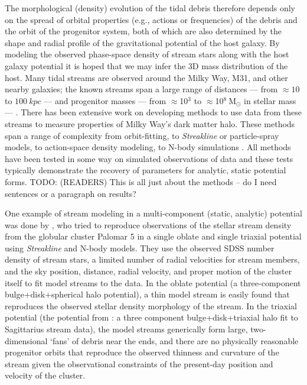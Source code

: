\documentclass[letterpaper,12pt,preprint]{aastex}
\newcommand{\msun}{\ensuremath{\mathrm{M}_\odot}}
\newcommand{\todo}[2]{{\color{red} TODO: (\MakeUppercase{#1}) #2}}
\begin{document}
The morphological (density) evolution of the tidal debris therefore depends only on the spread of orbital properties (e.g., actions or frequencies) of the debris and the orbit of the progenitor system, both of which are also determined by the shape and radial profile of the gravitational potential of the host galaxy. By modeling the observed phase-space density of stream stars along with the host galaxy potential it is hoped that we may infer the 3D mass distribution of the host. Many tidal streams are observed around the Milky Way, M31, and other nearby galaxies; the known streams span a large range of distances --- from $\approx10$ to $100~kpc$ --- and progenitor masses --- from $\approx$10$^3$ to $\approx$10$^8~\msun$ in stellar mass --- \citep[][]{cite many}. There has been extensive work on developing methods to use data from these streams to measure properties of Milky Way's dark matter halo. These methods span a range of complexity from orbit-fitting, to \emph{Streakline} or particle-spray models, to action-space density modeling, to N-body simulations \citep[see, e.g., the introduction of][]{kuepper15}. All methods have been tested in some way on simulated observations of data and these tests typically demonstrate the recovery of parameters for analytic, static potential forms. \todo{readers}{This is all just about the methods -- do I need sentences or a paragraph on results?}


One example of stream modeling in a multi-component (static, analytic) potential was done by \citet{pearson15}, who tried to reproduce observations of the stellar stream density from the globular cluster Palomar 5 in a single oblate and single triaxial potential using \emph{Streakline} \citep{kuepper12} and N-body models. They use the observed SDSS number density of stream stars, a limited number of radial velocities for stream members, and the sky position, distance, radial velocity, and proper motion of the cluster itself to fit model streams to the data. In the oblate potential (a three-component bulge+disk+spherical halo potential), a thin model stream is easily found that reproduces the observed stellar density morphology of the stream. In the triaxial potential (the potential from \cite{law10}: a three component bulge+disk+triaxial halo fit to Sagittarius stream data), the model streams generically form large, two-dimensional `fans' of debris near the ends, and there are no physically reasonable progenitor orbits that reproduce the observed thinness and curvature of the stream given the observational constraints of the present-day position and velocity of the cluster. 
\end{document}
